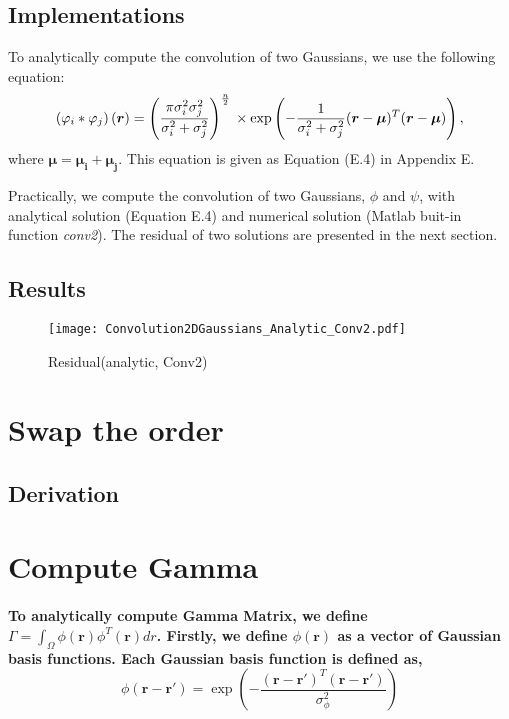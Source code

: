 \documentclass[a4paper, 12pt, english]{article}
\begin{document}
\subsection{Implementations}
To analytically compute the convolution of two Gaussians, we use the following
equation:
$$\left(\varphi_i\ast\varphi_j\right)(\boldsymbol{r}) = \left(\frac{\pi\sigma^2_i\sigma^2_j}{\sigma^2_i + \sigma^2_j}\right)^{\frac{n}{2}}\\
\times\exp\left(-\frac{1}{\sigma^2_i + \sigma^2_j}(\boldsymbol{r}-\boldsymbol{\mu})^T(\boldsymbol{r}-\boldsymbol{\mu})\right), $$
where $\boldsymbol{\mu} = \boldsymbol{\mu_i} + \boldsymbol{\mu_j} $.
This equation is given as Equation (E.4) in Appendix E.\par

Practically, we compute the convolution of two Gaussians, $\phi$ and $\psi $,
with analytical solution (Equation E.4) and numerical solution (Matlab
buit-in function \textit{conv2}).
The residual of two solutions are presented in the next section.


\subsection{Results}
\begin{figure}[H]
\centering
\texttt{[image: Convolution2DGaussians\_Analytic\_Conv2.pdf]}
\caption{Residual(analytic, Conv2)}\label{Convolution2DGaussians_Analytic_Conv2.pdf}
\end{figure}



\newpage

\section{Swap the order}

\subsection{Derivation}


\newpage

\section{Compute Gamma}

\paragraph{To analytically compute Gamma Matrix, we define
$\Gamma=\int_{\Omega}\phi(\boldsymbol{r})\phi^{T}(\boldsymbol{r})dr$.
Firstly, we define $\phi(\boldsymbol{r})$ as a vector of Gaussian basis functions.
Each Gaussian basis function is defined as,
$$\phi(\boldsymbol{r}-\boldsymbol{r}\prime)=\exp{\left(-\frac{(\boldsymbol{r}-\boldsymbol{r}\prime)^{T}(\boldsymbol{r}-\boldsymbol{r}\prime)}{\sigma_{\phi}^{2}}\right)}$$}
\end{document}
